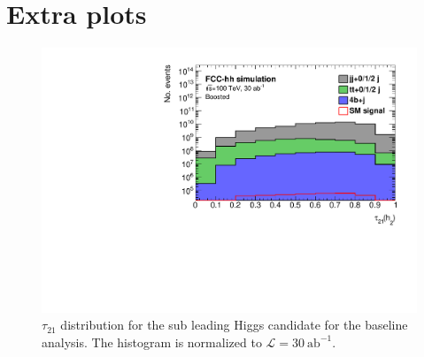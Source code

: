 
\chapter{Extra plots}
\label{chapter:extra_plots}

\begin{figure}[h]
	\centering
		\centering
		\includegraphics[trim={.65cm 0 0 0},clip,width=0.5\linewidth]{./Figures/hist_h2_tau21_stack.pdf}
	\caption{$\tau_{21}$ distribution for the sub leading Higgs candidate for the baseline analysis. The histogram is normalized to $\mathcal{L}=30~\text{ab}^{-1}$.}
	\label{fig:tau21_h2_stack}
\end{figure} 

